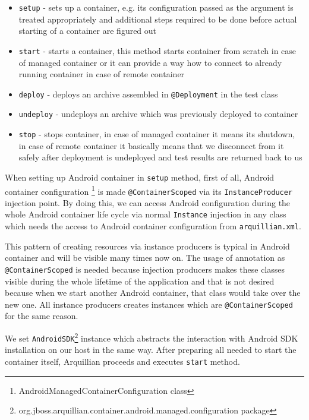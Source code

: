 \documentclass[12pt,final,oneside]{fithesis}
\begin{document}
\begin{itemize}
	\item{\texttt{setup} - sets up a container, e.g. its configuration passed as the argument is treated appropriately and additional steps required to be done before actual starting of a container are figured out}
	\item{\texttt{start} - starts a container, this method starts container from scratch in case of managed container or it can provide a way how to connect to already running container in case of remote container}
	\item{\texttt{deploy} - deploys an archive assembled in \texttt{@Deployment} in the test class}
	\item{\texttt{undeploy} - undeploys an archive which was previously deployed to container}
	\item{\texttt{stop} - stops container, in case of managed container it means its shutdown, in case of remote container it basically means that we disconnect from it safely after deployment is undeployed and test results are returned back to us}
\end{itemize}

When setting up Android container in \texttt{setup} method, first of all, Android container configuration \footnote{AndroidManagedContainerConfiguration class} is made \texttt{@ContainerScoped} via its \texttt{InstanceProducer} injection point. By doing this, we can access Android configuration during the whole Android container life cycle via normal \texttt{Instance} injection in any class which needs the access to Android container configuration from \texttt{arquillian.xml}.

This pattern of creating resources via instance producers is typical in Android container and will be visible many times now on. The usage of annotation as \texttt{@ContainerScoped} is needed because injection producers makes these classes visible during the whole lifetime of the application and that is not desired because when we start another Android container, that class would take over the new one. All instance producers creates instances which are \texttt{@ContainerScoped} for the same reason.

We set \texttt{AndroidSDK}\footnote{org.jboss.arquillian.container.android.managed.configuration package} instance which abstracts the interaction with Android SDK installation on our host in the same way. After preparing all needed to start the container itself, Arquillian proceeds and executes \texttt{start} method.
\end{document}
